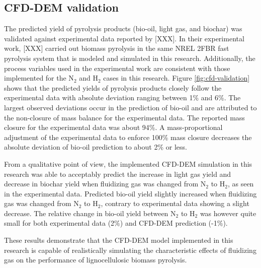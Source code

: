 
\subsection{CFD-DEM validation}

The predicted yield of pyrolysis products (bio-oil, light gas, and biochar) was validated against experimental data reported by [XXX]. In their experimental work, [XXX] carried out biomass pyrolysis in the same NREL 2FBR fast pyrolysis system that is modeled and simulated in this research. Additionally, the process variables used in the experimental work are consistent with those implemented for the N$_2$ and H$_2$ cases in this research. Figure \ref{fig:cfd-validation} shows that the predicted yields of pyrolysis products closely follow the experimental data with absolute deviation ranging between 1\% and 6\%. The largest observed deviations occur in the prediction of bio-oil and are attributed to the non-closure of mass balance for the experimental data. The reported mass closure for the experimental data was about 94\%. A mass-proportional adjustment of the experimental data to enforce 100\% mass closure decreases the absolute deviation of bio-oil prediction to about 2\% or less.

From a qualitative point of view, the implemented CFD-DEM simulation in this research was able to acceptably predict the increase in light gas yield and decrease in biochar yield when fluidizing gas was changed from N$_2$ to H$_2$, as seen in the experimental data. Predicted bio-oil yield slightly increased when fluidizing gas was changed from N$_2$ to H$_2$, contrary to experimental data showing a slight decrease. The relative change in bio-oil yield between N$_2$ to H$_2$ was however quite small for both experimental data (2\%) and CFD-DEM prediction (-1\%).

These results demonstrate that the CFD-DEM model implemented in this research is capable of realistically simulating the characteristic effects of fluidizing gas on the performance of lignocellulosic biomass pyrolysis.

